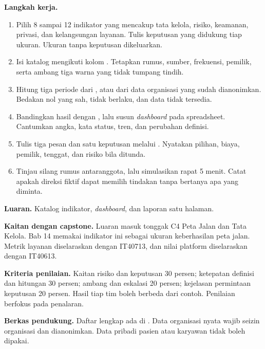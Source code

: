 \textbf{Langkah kerja.}
\begin{enumerate}
  \item Pilih 8 sampai 12 indikator yang mencakup tata kelola, risiko, keamanan, privasi, dan
  kelangsungan layanan. Tulis keputusan yang didukung tiap ukuran. Ukuran tanpa keputusan
  dikeluarkan.
  \item Isi katalog mengikuti kolom . Tetapkan
  rumus, sumber, frekuensi, pemilik, serta ambang tiga warna yang tidak tumpang tindih.
  \item Hitung tiga periode dari , atau dari data
  organisasi yang sudah dianonimkan. Bedakan nol yang sah, tidak berlaku, dan data tidak tersedia.
  \item Bandingkan hasil dengan , lalu susun
  \textit{dashboard} pada spreadsheet. Cantumkan angka, kata status, tren, dan perubahan definisi.
  \item Tulis tiga pesan dan satu keputusan melalui
  . Nyatakan pilihan, biaya, pemilik, tenggat,
  dan risiko bila ditunda.
  \item Tinjau silang rumus antaranggota, lalu simulasikan rapat 5 menit. Catat apakah direksi
  fiktif dapat memilih tindakan tanpa bertanya apa yang diminta.
\end{enumerate}

\textbf{Luaran.} Katalog indikator, \textit{dashboard}, dan laporan satu halaman.

\textbf{Kaitan dengan capstone.} Luaran masuk tonggak C4 Peta Jalan dan Tata Kelola. Bab 14 memakai
indikator ini sebagai ukuran keberhasilan peta jalan. Metrik layanan diselaraskan dengan IT40713,
dan nilai platform diselaraskan dengan IT40613.

\textbf{Kriteria penilaian.} Kaitan risiko dan keputusan 30 persen; ketepatan definisi dan hitungan
30 persen; ambang dan eskalasi 20 persen; kejelasan permintaan keputusan 20 persen. Hasil tiap tim
boleh berbeda dari contoh. Penilaian berfokus pada penalaran.

\textbf{Berkas pendukung.} Daftar lengkap ada di . Data
organisasi nyata wajib seizin organisasi dan dianonimkan. Data pribadi pasien atau karyawan tidak
boleh dipakai.

